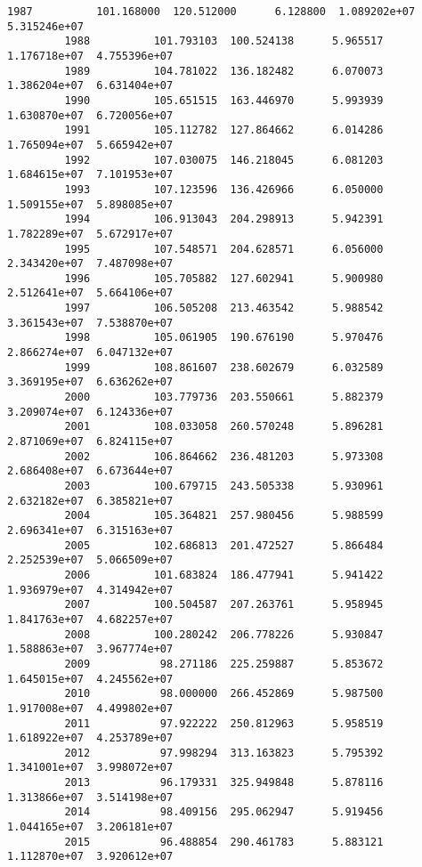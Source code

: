 \documentclass[11pt]{article}
\begin{document}
\begin{Verbatim}[commandchars=\\\{\}]
         1987          101.168000  120.512000      6.128800  1.089202e+07  5.315246e+07  
         1988          101.793103  100.524138      5.965517  1.176718e+07  4.755396e+07  
         1989          104.781022  136.182482      6.070073  1.386204e+07  6.631404e+07  
         1990          105.651515  163.446970      5.993939  1.630870e+07  6.720056e+07  
         1991          105.112782  127.864662      6.014286  1.765094e+07  5.665942e+07  
         1992          107.030075  146.218045      6.081203  1.684615e+07  7.101953e+07  
         1993          107.123596  136.426966      6.050000  1.509155e+07  5.898085e+07  
         1994          106.913043  204.298913      5.942391  1.782289e+07  5.672917e+07  
         1995          107.548571  204.628571      6.056000  2.343420e+07  7.487098e+07  
         1996          105.705882  127.602941      5.900980  2.512641e+07  5.664106e+07  
         1997          106.505208  213.463542      5.988542  3.361543e+07  7.538870e+07  
         1998          105.061905  190.676190      5.970476  2.866274e+07  6.047132e+07  
         1999          108.861607  238.602679      6.032589  3.369195e+07  6.636262e+07  
         2000          103.779736  203.550661      5.882379  3.209074e+07  6.124336e+07  
         2001          108.033058  260.570248      5.896281  2.871069e+07  6.824115e+07  
         2002          106.864662  236.481203      5.973308  2.686408e+07  6.673644e+07  
         2003          100.679715  243.505338      5.930961  2.632182e+07  6.385821e+07  
         2004          105.364821  257.980456      5.988599  2.696341e+07  6.315163e+07  
         2005          102.686813  201.472527      5.866484  2.252539e+07  5.066509e+07  
         2006          101.683824  186.477941      5.941422  1.936979e+07  4.314942e+07  
         2007          100.504587  207.263761      5.958945  1.841763e+07  4.682257e+07  
         2008          100.280242  206.778226      5.930847  1.588863e+07  3.967774e+07  
         2009           98.271186  225.259887      5.853672  1.645015e+07  4.245562e+07  
         2010           98.000000  266.452869      5.987500  1.917008e+07  4.499802e+07  
         2011           97.922222  250.812963      5.958519  1.618922e+07  4.253789e+07  
         2012           97.998294  313.163823      5.795392  1.341001e+07  3.998072e+07  
         2013           96.179331  325.949848      5.878116  1.313866e+07  3.514198e+07  
         2014           98.409156  295.062947      5.919456  1.044165e+07  3.206181e+07  
         2015           96.488854  290.461783      5.883121  1.112870e+07  3.920612e+07  
\end{Verbatim}
            
\end{document}
